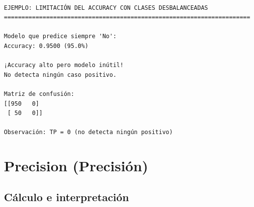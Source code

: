 \documentclass[
  doc,
  floatsintext,
  longtable,
  a4paper,
  nolmodern,
  notxfonts,
  notimes,
  12pt,
  colorlinks=true,linkcolor=blue,citecolor=blue,urlcolor=blue]{apa7}
\begin{document}
\begin{verbatim}

EJEMPLO: LIMITACIÓN DEL ACCURACY CON CLASES DESBALANCEADAS
======================================================================

Modelo que predice siempre 'No':
Accuracy: 0.9500 (95.0%)

¡Accuracy alto pero modelo inútil!
No detecta ningún caso positivo.

Matriz de confusión:
[[950   0]
 [ 50   0]]

Observación: TP = 0 (no detecta ningún positivo)
\end{verbatim}

\section{Precision (Precisión)}\label{precision-precisiuxf3n}

\subsection{Cálculo e
interpretación}\label{cuxe1lculo-e-interpretaciuxf3n-1}
\end{document}
